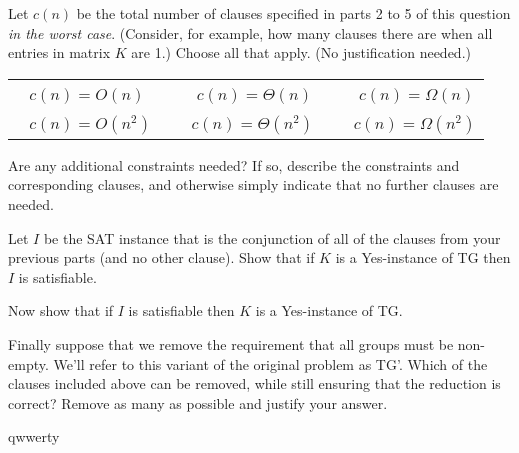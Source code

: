 \documentclass[11pt,fleqn]{exam}
\newcommand{\fillinMCmath}[1]{\begin{tikzpicture}\draw circle [radius=0.5em];\end{tikzpicture}\ #1}
\newif\ifsolutions\solutionsfalse
\begin{document}
\begin{questions}
\question[2]
  Let $c(n)$ be the total number of clauses specified in parts 2 to 5 of this question {\em in the worst case}. (Consider, for example, how many clauses there are when all entries in matrix $K$ are 1.) Choose all that apply. (No justification needed.)

  \vspace{.1in}

    \ifsolutions
    
    \else
      \begin{tabular}{lllll}
        \hspace{.5in} \fillinMCmath{} $c(n) = O(n)$ & \hspace{.5in} & \fillinMCmath{} $c(n) = \Theta(n)$ & \hspace{.5in} & \fillinMCmath{} $c(n) = \Omega(n)$ \\

      \hspace{.5in} \fillinMCmath{} $c(n) = O(n^2)$ & \hspace{.5in} & \fillinMCmath{}$c(n) = \Theta(n^2)$ & \hspace{.5in} & \fillinMCmath{}$c(n) = \Omega(n^2)$
      \end{tabular}
\fi
  \vspace{.1in}

\question[2]
Are any additional constraints needed? If so, describe the constraints and corresponding clauses, and otherwise simply indicate that no further clauses are needed.

    \ifsolutions
    
    \fi
\question[3]
Let $I$ be the SAT instance that is the conjunction of all of the clauses from your previous parts (and no other clause). Show that if $K$ is a Yes-instance of TG then $I$ is satisfiable.

    \ifsolutions
    
\fi

\question[3]
Now show that if $I$ is satisfiable then $K$ is a Yes-instance of TG.

    \ifsolutions
    
    \fi
    
\question[4]
  Finally suppose that we remove the requirement that all groups must be non-empty.
We'll refer to this variant of the original problem as TG'.
  Which of the clauses included above can be removed, while still ensuring that the reduction is correct? Remove as many as possible and justify your answer.

qwwerty

  \ifsolutions
    
\fi
\end{questions}
\end{document}
